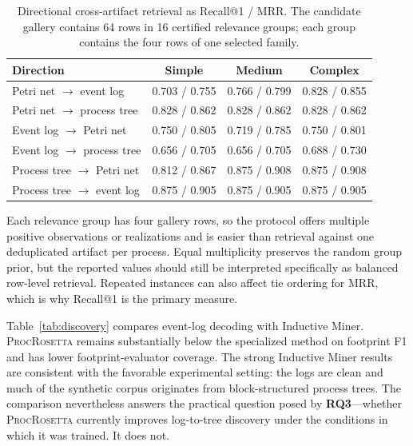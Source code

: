 \documentclass[pdflatex,sn-basic]{sn-jnl}
\newcommand{\model}{\textsc{ProcRosetta}\xspace}
\newcommand{\RQthree}{\textbf{RQ3}}
\begin{document}
\begin{table}[!t]
\centering
\caption{Directional cross-artifact retrieval as Recall@1 / MRR. The candidate gallery contains 64 rows in 16 certified relevance groups; each group contains the four rows of one selected family.}
\label{tab:retrieval}
\begin{tabular}{@{}lccc@{}}
\toprule
Direction & Simple & Medium & Complex \\
\midrule
Petri net $\rightarrow$ event log  & 0.703 / 0.755 & 0.766 / 0.799 & 0.828 / 0.855 \\
Petri net $\rightarrow$ process tree & 0.828 / 0.862 & 0.828 / 0.862 & 0.828 / 0.862 \\
Event log $\rightarrow$ Petri net  & 0.750 / 0.805 & 0.719 / 0.785 & 0.750 / 0.801 \\
Event log $\rightarrow$ process tree & 0.656 / 0.705 & 0.656 / 0.705 & 0.688 / 0.730 \\
Process tree $\rightarrow$ Petri net & 0.812 / 0.867 & 0.875 / 0.908 & 0.875 / 0.908 \\
Process tree $\rightarrow$ event log & 0.875 / 0.905 & 0.875 / 0.905 & 0.875 / 0.905 \\
\bottomrule
\end{tabular}
\end{table}

Each relevance group has four gallery rows, so the protocol offers multiple positive observations or realizations and is easier than retrieval against one deduplicated artifact per process. Equal multiplicity preserves the random group prior, but the reported values should still be interpreted specifically as balanced row-level retrieval. Repeated instances can also affect tie ordering for MRR, which is why Recall@1 is the primary measure.

Table~\ref{tab:discovery} compares event-log decoding with Inductive Miner. \model remains substantially below the specialized method on footprint F1 and has lower footprint-evaluator coverage. The strong Inductive Miner results are consistent with the favorable experimental setting: the logs are clean and much of the synthetic corpus originates from block-structured process trees. The comparison nevertheless answers the practical question posed by \RQthree---whether \model currently improves log-to-tree discovery under the conditions in which it was trained. It does not.
\end{document}
